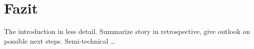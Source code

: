 \section{Fazit} \label{fazit}

The introduction in less detail. Summarize story in retrospective, give outlook on possible next steps. Semi-technical \ldots
